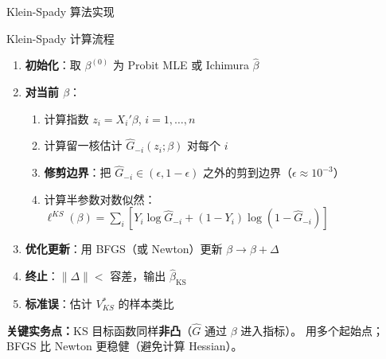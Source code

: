 \documentclass[aspectratio=169, 10pt]{beamer}
\begin{document}
\begin{frame}{Klein-Spady 算法实现}

  \begin{examplebox}{{Klein-Spady 计算流程}}
    \begin{enumerate}\setlength{\itemsep}{1pt}
      \item \textbf{初始化}：取 $\beta^{(0)}$ 为 Probit MLE 或 Ichimura $\hat\beta$
      \item \textbf{对当前 $\beta$}：
      \begin{enumerate}
        \item 计算指数 $z_i = X_i'\beta$, $i = 1, \ldots, n$
        \item 计算留一核估计 $\hat G_{-i}(z_i; \beta)$ 对每个 $i$
        \item \textbf{修剪边界}：把 $\hat G_{-i} \in (\epsilon, 1-\epsilon)$ 之外的剪到边界（$\epsilon \approx 10^{-3}$）
        \item 计算半参数对数似然：
        $\ell^{KS}(\beta) = \sum_i [Y_i \log \hat G_{-i} + (1-Y_i)\log(1 - \hat G_{-i})]$
      \end{enumerate}
      \item \textbf{优化更新}：用 BFGS（或 Newton）更新 $\beta \to \beta + \Delta$
      \item \textbf{终止}：$\|\Delta\| < $ 容差，输出 $\hat\beta_{\text{KS}}$
      \item \textbf{标准误}：估计 $V^{*}_{KS}$ 的样本类比
    \end{enumerate}
  \end{examplebox}

  \begin{keybox}
    \textbf{关键实务点：}KS 目标函数同样\textbf{非凸}（$\hat G$ 通过 $\beta$ 进入指标）。
    用多个起始点；BFGS 比 Newton 更稳健（避免计算 Hessian）。
  \end{keybox}

\end{frame}
\end{document}
